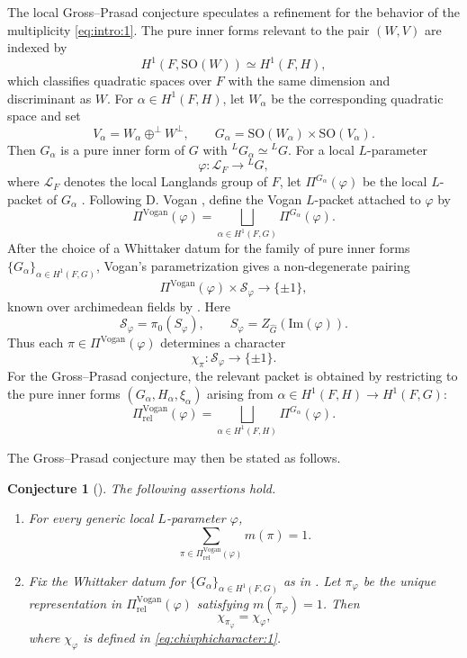 \documentclass[12pt]{amsart}
\numberwithin{equation}{subsection}
\newcommand{\CL}{{\mathcal {L}}}
\newcommand{\CS}{{\mathcal {S}}}
\renewcommand{\Im}{{\mathrm{Im}}}
\newcommand{\SO}{{\mathrm{SO}}}
\newcommand{\wh}{\widehat}
\def\alp{{\alpha}}
\def\LG{{}^{L}G}
\def\vphi{\varphi}
\def\Vg{\mathrm{Vogan}}
\def\rel{\mathrm{rel}}
\def\SO{\mathrm{SO}}
\newtheorem{conjec}[thm]{Conjecture}
\begin{document}
The local Gross--Prasad conjecture speculates a refinement for the behavior of the multiplicity \eqref{eq:intro:1}. The pure inner forms relevant to the pair
$(W,V)$ are indexed by
\[
H^1(F,\SO(W))\simeq H^1(F,H),
\]
which classifies quadratic spaces over $F$ with the same dimension and
discriminant as $W$. For $\alp\in H^1(F,H)$, let $W_\alp$ be the corresponding
quadratic space and set
\[
V_\alp=W_\alp\oplus^\perp W^\perp,\qquad
G_\alp=\SO(W_\alp)\times \SO(V_\alp).
\]
Then $G_\alp$ is a pure inner form of $G$ with ${}^LG_\alp\simeq \LG$. For a local $L$-parameter
\[
\vphi:\CL_F\to \LG,
\]
where $\CL_F$ denotes the local Langlands group of $F$, let
$\Pi^{G_\alp}(\vphi)$ be the local $L$-packet of $G_\alp$
\cite{langlandsproblems}. Following D. Vogan \cite{MR1216197}, define the Vogan $L$-packet attached to
$\vphi$ by
\[
\Pi^{\Vg}(\vphi)=
\bigsqcup_{\alp\in H^1(F,G)}\Pi^{G_\alp}(\vphi).
\]
After the choice of a Whittaker datum for the family of pure inner forms
$\{G_\alp\}_{\alp\in H^1(F,G)}$, Vogan's parametrization gives a
non-degenerate pairing
\[
\Pi^{\Vg}(\vphi)\times \CS_\vphi \to \{\pm 1\},
\]
known over archimedean fields by \cite[Thm.~6.3]{MR1216197}. Here
\[
\CS_\vphi=\pi_0(S_\vphi),\qquad
S_\vphi=Z_{\wh{G}}(\Im(\vphi)).
\]
Thus each $\pi\in \Pi^{\Vg}(\vphi)$ determines a character
\[
\chi_\pi:\CS_\vphi\to \{\pm 1\}.
\]
For the Gross--Prasad conjecture, the relevant packet is obtained by restricting
to the pure inner forms $(G_\alp,H_\alp,\xi_\alp)$ arising from $\alp\in H^1(F,H)\to H^1(F,G)$:
\[
\Pi^{\Vg}_\rel(\vphi)
=
\bigsqcup_{\alp\in H^1(F,H)}\Pi^{G_\alp}(\vphi).
\]

The Gross--Prasad conjecture may then be stated as follows.

\begin{conjec}[\cite{MR1186476,MR1295124}]\label{conjec:ggp:intro}
The following assertions hold.
\begin{enumerate}
    \item
    For every generic local $L$-parameter $\vphi$,
    \[
    \sum_{\pi\in \Pi^{\Vg}_{\rel}(\vphi)}m(\pi)=1.
    \]

    \item
    Fix the Whittaker datum for $\{G_\alp\}_{\alp\in H^1(F,G)}$ as in
    \cite[(6.3)]{MR1295124}. Let $\pi_\vphi$ be the unique representation in
    $\Pi^\Vg_\rel(\vphi)$ satisfying $m(\pi_\vphi)=1$. Then
    \[
    \chi_{\pi_\vphi}=\chi_\vphi,
    \]
    where $\chi_\vphi$ is defined in \eqref{eq:chivphicharacter:1}.
\end{enumerate}
\end{conjec}
\end{document}
